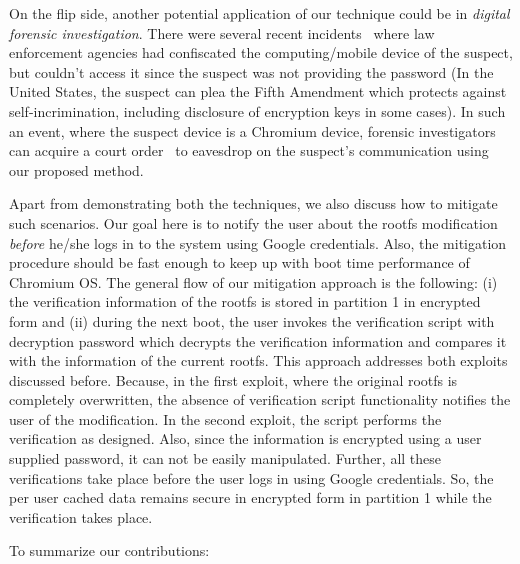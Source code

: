 \documentclass[11pt]{article}
\begin{document}

On the flip side, another potential application of our technique could be in \textit{digital forensic investigation}. There were several recent incidents~\cite{fde} where law enforcement agencies had confiscated the computing/mobile device of the suspect, but couldn't access it since the suspect was not providing the password (In the United States, the suspect can plea the Fifth Amendment which protects against self-incrimination, including disclosure of encryption keys in some cases). In such an event, where the suspect device is a Chromium device, forensic investigators can acquire a court order~\cite{wiretap} to eavesdrop on the suspect's communication using our proposed method. 

Apart from demonstrating both the techniques, we also discuss how to mitigate such scenarios. Our goal here is to notify the user about the rootfs modification \textit{before} he/she logs in to the system using Google credentials. Also, the mitigation procedure should be fast enough to keep up with boot time performance of Chromium OS. The general flow of our mitigation approach is the following: (i) the verification information of the rootfs is stored in partition 1 in encrypted form and (ii) during the next boot, the user invokes the verification script with decryption password which decrypts the verification information and compares it with the information of the current rootfs. This approach addresses both exploits discussed before. Because, in the first exploit, where the original rootfs is completely overwritten, the absence of verification script functionality notifies the user of the modification. In the second exploit, the script performs the verification as designed. Also, since the information is encrypted using a user supplied password, it can not be easily manipulated. Further, all these verifications take place before the user logs in using Google credentials. So, the per user cached data remains secure in encrypted form in partition 1 while the verification takes place.

To summarize our contributions:
\end{document}
